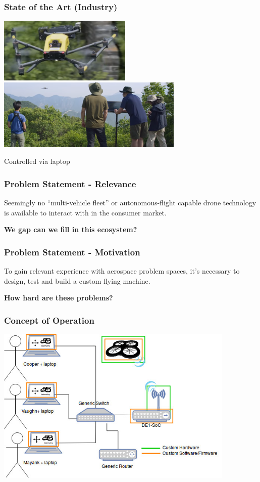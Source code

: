 \documentclass{beamer}
\begin{document}
\begin{frame}
\frametitle{State of the Art (Industry)}
\begin{center}
\includegraphics[width=2.5in]{../src/im/great_wall2}
\break
\includegraphics[width=3.5in]{../src/im/great_wall3}

Controlled via laptop
\end{center}
\end{frame}

\begin{frame}
\frametitle{Problem Statement - Relevance}
\Large
Seemingly no ``multi-vehicle fleet'' or autonomous-flight capable drone
technology is available to interact with in the consumer market.
\break

\textbf{We gap can we fill in this ecosystem?}
\end{frame}

\begin{frame}
\frametitle{Problem Statement - Motivation}
\Large
To gain relevant experience with aerospace problem spaces, it's necessary
to design, test and build a custom flying machine.
\break

\textbf{How hard are these problems?}
\end{frame}

\begin{frame}
\frametitle{Concept of Operation}
\begin{center}
\includegraphics[width=4.5in]{../src/im/conops}
\end{center}
\end{frame}
\end{document}
